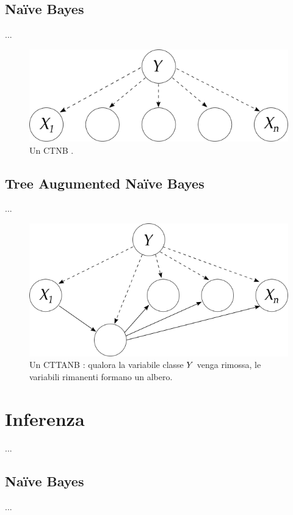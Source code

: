 \subsection{Na\"ive Bayes}\label{sec:learning-ctnb}
...

\begin{figure}
\centering
\includegraphics[width=0.9\columnwidth]{immagini/ctnb}
\caption[Un \acs{CTNB} \class{}]{Un \acl{CTNB} \class{}.}
\label{fig:ctnb}
\end{figure}

\subsection{Tree Augumented Na\"ive Bayes}\label{sec:learning-cttanb}
...

\begin{figure}
\centering
\includegraphics[width=0.9\columnwidth]{immagini/cttanb}
\caption[Un \acs{CTTANB} \class{}]{Un \acl{CTTANB} \class{}: qualora la variabile classe $\mathnormal{Y}$ venga rimossa, le variabili rimanenti formano un albero.}
\label{fig:cttanb}
\end{figure}

\section{Inferenza}\label{sec:inference-ctbnc}
...

\subsection{Na\"ive Bayes}\label{sec:inference-ctnb}
...


